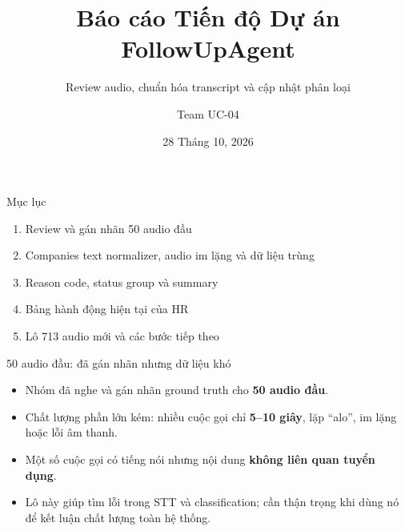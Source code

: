 \documentclass{beamer}
\title[Tiến độ FollowUpAgent]{Báo cáo Tiến độ Dự án FollowUpAgent}
\subtitle{Review audio, chuẩn hóa transcript và cập nhật phân loại}
\author[]{Team UC-04}
\institute{}
\date{28 Tháng 10, 2026}
\begin{document}
\frame{\titlepage}

\begin{frame}{Mục lục}
\begin{enumerate}
    \item Review và gán nhãn 50 audio đầu
    \item Companies text normalizer, audio im lặng và dữ liệu trùng
    \item Reason code, status group và summary
    \item Bảng hành động hiện tại của HR
    \item Lô 713 audio mới và các bước tiếp theo
\end{enumerate}
\end{frame}

\begin{frame}{50 audio đầu: đã gán nhãn nhưng dữ liệu khó}
\begin{itemize}
    \item Nhóm đã nghe và gán nhãn ground truth cho \textbf{50 audio đầu}.
    \item Chất lượng phần lớn kém: nhiều cuộc gọi chỉ \textbf{5--10 giây}, lặp ``alo'', im lặng hoặc lỗi âm thanh.
    \item Một số cuộc gọi có tiếng nói nhưng nội dung \textbf{không liên quan tuyển dụng}.
    \item Lô này giúp tìm lỗi trong STT và classification; cần thận trọng khi dùng nó để kết luận chất lượng toàn hệ thống.
\end{itemize}
\end{frame}
\end{document}
